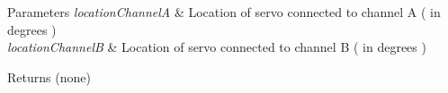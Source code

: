 \begin{DoxyParams}{\-Parameters}
{\em location\-Channel\-A} & \-Location of servo connected to channel \-A ( in degrees ) \\
\hline
{\em location\-Channel\-B} & \-Location of servo connected to channel \-B ( in degrees ) \\
\hline
\end{DoxyParams}
\begin{DoxyReturn}{\-Returns}
(none) 
\end{DoxyReturn}
